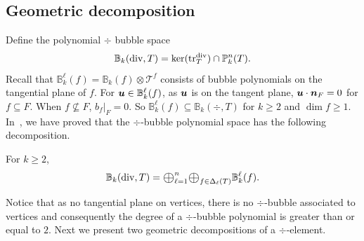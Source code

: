 \documentclass[mathpazo]{cicp}
\newcommand{\Oplus}{\ensuremath{\vcenter{\hbox{\scalebox{1.5}{$\oplus$}}}}}
\begin{document}
\subsection{Geometric decomposition}
Define the polynomial $\div$ bubble space
$$
\mathbb B_k(\operatorname{div}, T) = \ker(\operatorname{tr}_T^{\operatorname{div}})\cap \mathbb P_k^n(T).
$$
Recall that $\mathbb B_{k}^{\ell}(f) = \mathbb B_k(f) \otimes \mathscr{T}^f$ consists of bubble polynomials on the tangential plane of $f$. For $\boldsymbol u\in \mathbb B_{k}^{\ell}(f)$, as $\boldsymbol u$ is on the tangent plane, $\boldsymbol u\cdot \boldsymbol n_F = 0$ for $f\subseteq F$. When $f\not\subseteq F$, $b_f|_F =0$. So $\mathbb B_{k}^{\ell}(f)\subseteq \mathbb B_k(\div, T)$
for $k\geq 2$ and $\dim f \geq 1$. In~\cite{Chen;Huang:2021Geometric}, 
we have proved that the $\div$-bubble polynomial space has the following decomposition.
\begin{lemma}\label{lem:divbubble}
For $k\geq 2$,
$$
\mathbb B_k(\div, T) = \Oplus_{\ell=1}^n\Oplus_{f\in\Delta_{\ell}(T)}\mathbb B_{k}^{\ell}(f).
$$
\end{lemma}
Notice that as no tangential plane on vertices, there is no $\div$-bubble associated to vertices and consequently the degree of a $\div$-bubble polynomial is greater than or equal to $2$. 
%
Next we present two geometric decompositions of a $\div$-element. 

\end{document}
